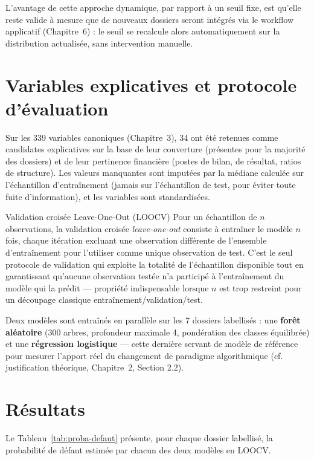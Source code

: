 L'avantage de cette approche dynamique, par rapport à un seuil fixe, est qu'elle reste valide à
mesure que de nouveaux dossiers seront intégrés via le workflow applicatif (Chapitre~6) : le
seuil se recalcule alors automatiquement sur la distribution actualisée, sans intervention
manuelle.

\section{Variables explicatives et protocole d'évaluation}

Sur les 339 variables canoniques (Chapitre~3), 34 ont été retenues comme candidates explicatives
sur la base de leur couverture (présentes pour la majorité des dossiers) et de leur pertinence
financière (postes de bilan, de résultat, ratios de structure). Les valeurs manquantes sont
imputées par la médiane calculée sur l'échantillon d'entraînement (jamais sur l'échantillon de
test, pour éviter toute fuite d'information), et les variables sont standardisées.

\begin{definition}{Validation croisée Leave-One-Out (LOOCV)}
Pour un échantillon de $n$ observations, la validation croisée \emph{leave-one-out} consiste à
entraîner le modèle $n$ fois, chaque itération excluant une observation différente de
l'ensemble d'entraînement pour l'utiliser comme unique observation de test. C'est le seul
protocole de validation qui exploite la totalité de l'échantillon disponible tout en garantissant
qu'aucune observation testée n'a participé à l'entraînement du modèle qui la prédit — propriété
indispensable lorsque $n$ est trop restreint pour un découpage classique
entraînement/validation/test.
\end{definition}

Deux modèles sont entraînés en parallèle sur les 7 dossiers labellisés : une \textbf{forêt
aléatoire} (300 arbres, profondeur maximale 4, pondération des classes équilibrée) et une
\textbf{régression logistique} — cette dernière servant de modèle de référence pour mesurer
l'apport réel du changement de paradigme algorithmique (cf. justification théorique,
Chapitre~2, Section 2.2).

\section{Résultats}

Le Tableau~\ref{tab:proba-defaut} présente, pour chaque dossier labellisé, la probabilité de
défaut estimée par chacun des deux modèles en LOOCV.

